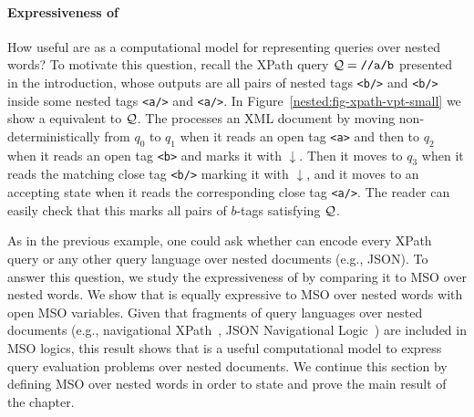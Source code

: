\paragraph{Expressiveness of \vpannnames} How useful are \vpann as a computational model for representing queries over nested words? To motivate this question, recall the XPath query $\mathcal{Q} = \texttt{//a/b}$ presented in the introduction, whose outputs are all pairs of nested tags \texttt{<b/>} and \texttt{<b/>} inside some nested tags \texttt{<a/>} and \texttt{<a/>}. In Figure~\ref{nested:fig-xpath-vpt-small} we show a \vpann equivalent to $\mathcal{Q}$. The \vpann processes an XML document by moving non-deterministically from $q_0$ to $q_1$ when it reads an open tag \texttt{<a>} and then to $q_2$ when it reads an open tag \texttt{<b>} and marks it with $\downarrow$. Then it moves to $q_3$ when it reads the matching close tag \texttt{<b/>} marking it with $\downarrow$, and it moves to an accepting state when it reads the corresponding close tag \texttt{<a/>}. The reader can easily check that this \vpann marks all pairs of $b$-tags satisfying $\mathcal{Q}$.  



As in the previous example, one could ask whether \vpann can encode every XPath query or any other query language over nested documents (e.g., JSON). To answer this question, we study the expressiveness of \vpann by comparing it to MSO over nested words. We show that \vpann is equally expressive to MSO over nested words with 
open MSO variables. Given that fragments of query languages over nested documents (e.g., navigational XPath~\cite{CateM07}, JSON Navigational Logic~\cite{BourhisRV20}) are included in MSO logics, this result shows that \vpann is a useful computational model to express query evaluation problems over nested documents. We continue this section by defining MSO over nested words in order to state and prove the main result of the chapter.

